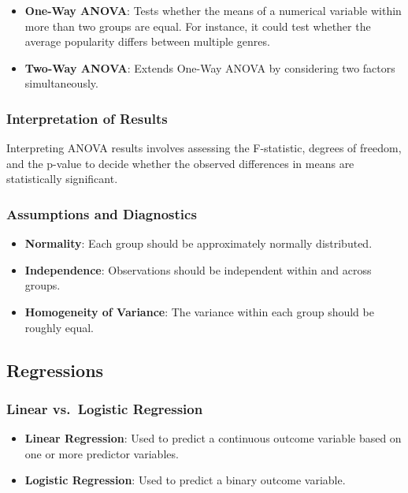 \documentclass[
  b5paper]{book}
\providecommand{\tightlist}{%
  \setlength{\itemsep}{0pt}\setlength{\parskip}{0pt}}
\begin{document}
\begin{itemize}
\item
  \textbf{One-Way ANOVA}: Tests whether the means of a numerical variable within more than two groups are equal. For instance, it could test whether the average popularity differs between multiple genres.
\item
  \textbf{Two-Way ANOVA}: Extends One-Way ANOVA by considering two factors simultaneously.
\end{itemize}

\hypertarget{interpretation-of-results}{%
\subsubsection{Interpretation of Results}\label{interpretation-of-results}}

Interpreting ANOVA results involves assessing the F-statistic, degrees of freedom, and the p-value to decide whether the observed differences in means are statistically significant.

\hypertarget{assumptions-and-diagnostics}{%
\subsubsection{Assumptions and Diagnostics}\label{assumptions-and-diagnostics}}

\begin{itemize}
\tightlist
\item
  \textbf{Normality}: Each group should be approximately normally distributed.
\item
  \textbf{Independence}: Observations should be independent within and across groups.
\item
  \textbf{Homogeneity of Variance}: The variance within each group should be roughly equal.
\end{itemize}

\hypertarget{regressions}{%
\subsection{Regressions}\label{regressions}}

\hypertarget{linear-vs.-logistic-regression}{%
\subsubsection{Linear vs.~Logistic Regression}\label{linear-vs.-logistic-regression}}

\begin{itemize}
\tightlist
\item
  \textbf{Linear Regression}: Used to predict a continuous outcome variable based on one or more predictor variables.
\item
  \textbf{Logistic Regression}: Used to predict a binary outcome variable.
\end{itemize}
\end{document}
